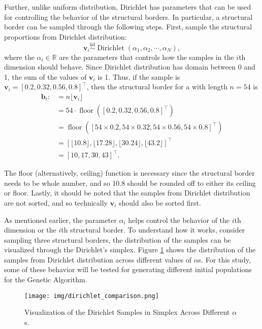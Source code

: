 Further, unlike uniform distribution, Dirichlet has parameters that can be used for controlling the behavior of the structural borders. In particular, a structural border can be sampled through the following steps. First, sample the structural proportions from Dirichlet distribution:
\begin{equation}
    \mathbf{v}_i\overset{\text{iid}}{\sim}\operatorname{Dirichlet}(\alpha_1,\alpha_2,\cdots,\alpha_N),
\end{equation}
where the $\alpha_i\in\mathbb{R}$ are the parameters that controls how the samples in the $i$th dimension should behave. Since Dirichlet distribution has domain between 0 and 1, the sum of the values of $\mathbf{v}_i$ is 1. Thus, if the sample is $\mathbf{v}_i=[0.2, 0.32, 0.56, 0.8]^{\top}$, then the structural border for a   with length $n=54$ is
\begin{align}
    \mathbf{b}_{i}:&=n\lfloor\mathbf{v}_i\rfloor\\
    &=54\cdot\operatorname{floor}([0.2, 0.32, 0.56, 0.8]^{\top})\\
    &=\operatorname{floor}([54\times 0.2, 54\times 0.32, 54\times 0.56, 54\times 0.8]^{\top})\\
    &=[\lfloor 10.8\rfloor, \lfloor 17.28\rfloor , \lfloor 30.24\rfloor , \lfloor 43.2\rfloor ]^{\top}\\
    &=[10, 17, 30, 43]^{\top}.
\end{align}

The floor (alternatively, ceiling) function is necessary since the structural border needs to be whole number, and so 10.8 should be rounded off to either its ceiling or floor. Lastly, it should be noted that the samples from Dirichlet distribution are not sorted, and so technically $\mathbf{v}_i$ should also be sorted first. 

As mentioned earlier, the parameter $\alpha_i$ helps control the behavior of the $i$th dimension or the $i$th structural border. To understand how it works, consider sampling three structural borders, the distribution of the samples can be visualized through the Dirichlet's simplex. Figure \ref{fig:result_dirichlet_simplex} shows the distribution of the samples from Dirichlet distribution across different values of $\alpha$s. For this study, some of these behavior will be tested for generating different initial populations for the Genetic Algorithm.

\begin{figure}[!t]
    \centering
    \texttt{[image: img/dirichlet\_comparison.png]}
    \caption{Visualization of the Dirichlet Samples in Simplex Across Different $\alpha$s.}
    \label{fig:result_dirichlet_simplex}
\end{figure}
